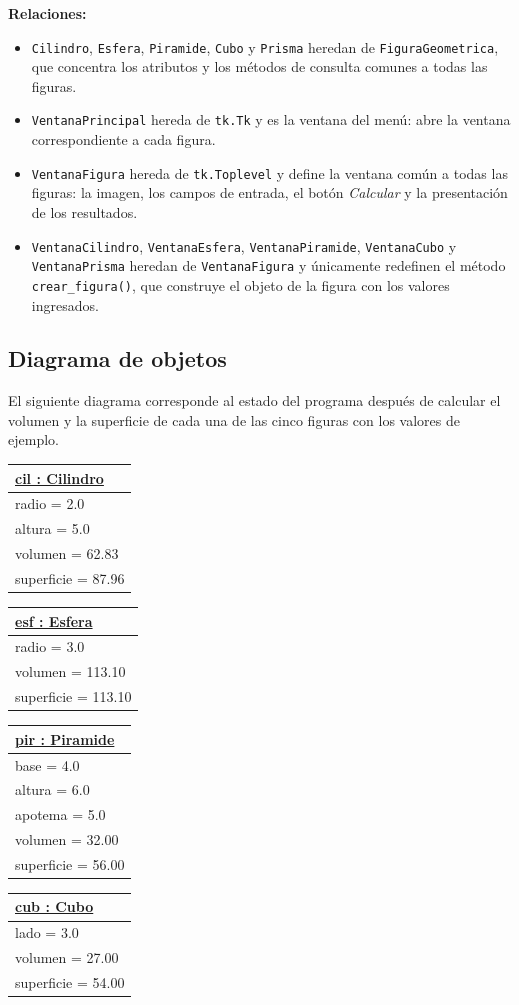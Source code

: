\documentclass[11pt, a4paper]{article}
\newcommand{\objetobox}[2]{%
\begin{center}
\begin{tabular}{|l|}
\hline
\underline{\textbf{#1}} \\
\hline
#2
\hline
\end{tabular}
\end{center}
}
\begin{document}
\noindent \textbf{Relaciones:}
\begin{itemize}
    \item \texttt{Cilindro}, \texttt{Esfera}, \texttt{Piramide}, \texttt{Cubo} y \texttt{Prisma}
          heredan de \texttt{FiguraGeometrica}, que concentra los atributos y los métodos de
          consulta comunes a todas las figuras.
    \item \texttt{VentanaPrincipal} hereda de \texttt{tk.Tk} y es la ventana del menú: abre la
          ventana correspondiente a cada figura.
    \item \texttt{VentanaFigura} hereda de \texttt{tk.Toplevel} y define la ventana común a todas
          las figuras: la imagen, los campos de entrada, el botón \textit{Calcular} y la
          presentación de los resultados.
    \item \texttt{VentanaCilindro}, \texttt{VentanaEsfera}, \texttt{VentanaPiramide},
          \texttt{VentanaCubo} y \texttt{VentanaPrisma} heredan de \texttt{VentanaFigura} y
          únicamente redefinen el método \texttt{crear\_figura()}, que construye el objeto de la
          figura con los valores ingresados.
\end{itemize}

\subsection{Diagrama de objetos}
El siguiente diagrama corresponde al estado del programa después de calcular el volumen y la
superficie de cada una de las cinco figuras con los valores de ejemplo.

\objetobox{cil : Cilindro}
{%
radio = 2.0 \\
altura = 5.0 \\
volumen = 62.83 \\
superficie = 87.96 \\
}

\objetobox{esf : Esfera}
{%
radio = 3.0 \\
volumen = 113.10 \\
superficie = 113.10 \\
}

\objetobox{pir : Piramide}
{%
base = 4.0 \\
altura = 6.0 \\
apotema = 5.0 \\
volumen = 32.00 \\
superficie = 56.00 \\
}

\objetobox{cub : Cubo}
{%
lado = 3.0 \\
volumen = 27.00 \\
superficie = 54.00 \\
}
\end{document}
